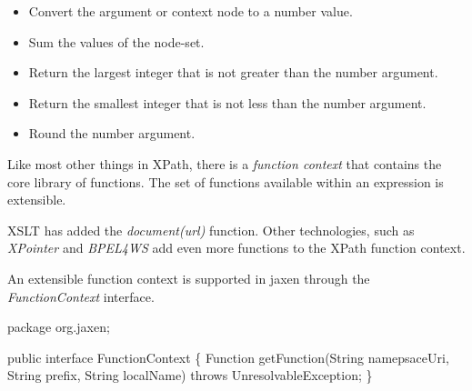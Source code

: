 \documentclass[20pt,landscape,headrule,footrule]{foils}
\begin{document}
\begin{minipage}{\textwidth}
\small
\begin{itemize}
  \item {}
    Convert the argument or context node to a number value.
  \item {}
    Sum the values of the node-set.
  \item {}
    Return the largest integer that is not greater than
    the number argument.
  \item {}
    Return the smallest integer that is not less than the
    number argument.
  \item {}
    Round the number argument.
\end{itemize}
\end{minipage}



Like most other things in XPath, there is a \emph{function context}
that contains the core library of functions. The set of functions available
within an expression is extensible.  

XSLT has added the
\emph{document(\textsl{url})} function.  Other technologies, such as 
\emph{XPointer} and \emph{BPEL4WS} add even more functions to
the XPath function context.



An extensible function context is supported in jaxen through the
\emph{FunctionContext} interface.

\begin{codelisting}
package org.jaxen;

public interface FunctionContext
\{
    Function getFunction(String namepsaceUri,
                         String prefix,
                         String localName)
        throws UnresolvableException;
\}
\end{codelisting}
\end{document}
